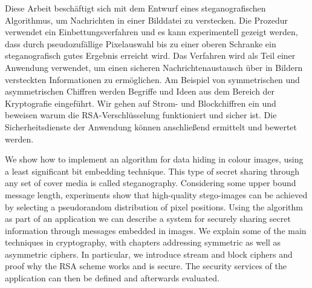 \newenvironment{abstractpage}
{\cleardoublepage\vspace*{\fill}\thispagestyle{empty}}
{\vfill\cleardoublepage}
\newenvironment{myabstract}[1]
{\bigskip\selectlanguage{#1}
  \begin{center}
    \bfseries\abstractname
  \end{center}}
{\par\bigskip}

\begin{abstractpage}
  \begin{myabstract}{german}
    Diese Arbeit beschäftigt sich mit dem Entwurf eines steganografischen Algorithmus, um
    Nachrichten in einer Bilddatei zu verstecken.
    Die Prozedur verwendet ein  Einbettungsverfahren und es
    kann experimentell gezeigt werden, dass durch pseudozufällige
    Pixelauswahl bis zu einer oberen Schranke ein
    steganografisch gutes Ergebnis erreicht wird.
    Das Verfahren wird als Teil einer Anwendung verwendet,
    um einen sicheren Nachrichtenaustausch über in Bildern versteckten
    Informationen zu ermöglichen. Am Beispiel von
    symmetrischen und asymmetrischen Chiffren werden Begriffe und Ideen
    aus dem Bereich der Kryptografie eingeführt. Wir gehen auf
    Strom- und Blockchiffren ein und beweisen warum die
    RSA-Verschlüsselung funktioniert und sicher ist.
    Die Sicherheitsdienste der Anwendung können anschließend ermittelt
    und bewertet werden.
  \end{myabstract}
  \begin{myabstract}{english}
    We show how to implement an algorithm for data hiding in colour images,
    using a least significant bit embedding technique.
    This type of secret sharing through any set of cover media
    is called steganography.
    Considering some upper bound message length,
    experiments show that high-quality stego-images can be achieved
    by selecting a pseudorandom distribution of pixel positions.
    Using the algorithm as part of an application we can describe a system
    for securely sharing secret information through messages embedded in images.
    We explain some of the main techniques in cryptography, with chapters
    addressing symmetric as well as asymmetric ciphers.
    In particular, we introduce stream and block ciphers and proof why the
    RSA scheme works and is secure. The security services of the
    application can then be defined and afterwards evaluated.
  \end{myabstract}
\end{abstractpage}